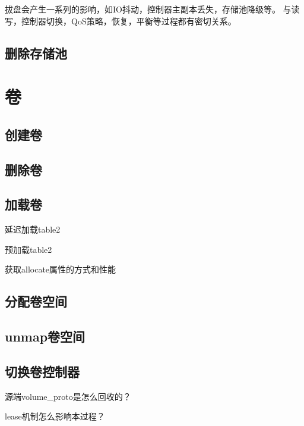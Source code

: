 拔盘会产生一系列的影响，如IO抖动，控制器主副本丢失，存储池降级等。
与读写，控制器切换，QoS策略，恢复，平衡等过程都有密切关系。

\subsection{删除存储池}

\section{卷}

\subsection{创建卷}

\subsection{删除卷}

\subsection{加载卷}

\begin{compactenum}
\item 延迟加载table2
\item 预加载table2
\item 获取allocate属性的方式和性能
\end{compactenum}

\subsection{分配卷空间}

\subsection{unmap卷空间}

\subsection{切换卷控制器}

\begin{compactenum}
\item 源端volume\_proto是怎么回收的？
\item lease机制怎么影响本过程？
\end{compactenum}

